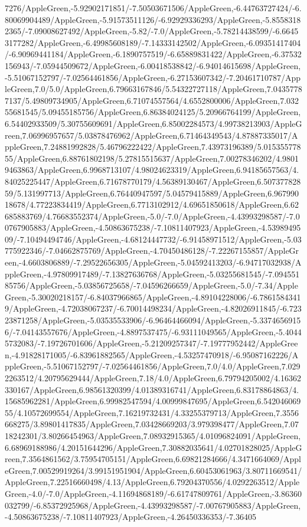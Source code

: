 {\begin{tikzternal}
7276/AppleGreen,-5.92902171851/-7.50503671506/AppleGreen,-6.44763727424/-6.80069904489/AppleGreen,-5.91573511126/-6.92929336293/AppleGreen,-5.85583182365/-7.09008627492/AppleGreen,-5.82/-7.0/AppleGreen,-5.78214438599/-6.66453177282/AppleGreen,-6.49985608189/-7.14333142502/AppleGreen,-6.09351417404/-6.90969441184/AppleGreen,-6.1890757519/-6.65889831422/AppleGreen,-6.37532156943/-7.05944509672/AppleGreen,-6.00418538842/-6.94014615698/AppleGreen,-5.51067152797/-7.02564461856/AppleGreen,-6.27153607342/-7.20461710787/AppleGreen,7.0/5.0/AppleGreen,6.79663167846/5.54322727118/AppleGreen,7.04357787137/5.49809734905/AppleGreen,6.71074557564/4.6552800006/AppleGreen,7.03255681545/5.09455185756/AppleGreen,6.86384024125/5.20966764199/AppleGreen,6.54402933509/5.30755609691/AppleGreen,6.85002284573/4.99738213903/AppleGreen,7.06996957657/5.03878476962/AppleGreen,6.71464349543/4.87887335017/AppleGreen,7.24881992828/5.46796222422/AppleGreen,7.43973196389/5.01535577855/AppleGreen,6.88761802198/5.27815515637/AppleGreen,7.00278346202/4.98019463863/AppleGreen,6.9968713107/4.98024623319/AppleGreen,6.94185657563/4.84025225447/AppleGreen,6.71678770179/4.56389130467/AppleGreen,6.50737782859/5.131997713/AppleGreen,6.76440947597/5.04579415889/AppleGreen,6.96799018678/4.77223834419/AppleGreen,6.7713102912/4.69651850618/AppleGreen,6.62685883769/4.76683552374/AppleGreen,-5.0/-7.0/AppleGreen,-4.43993298587/-7.00767905883/AppleGreen,-4.50863675238/-7.10811407923/AppleGreen,-4.5398949509/-7.10494494746/AppleGreen,-4.68124447732/-6.91458971512/AppleGreen,-5.03775922346/-7.04662875769/AppleGreen,-4.70450486128/-7.22267155857/AppleGreen,-4.6603806889/-7.29522656305/AppleGreen,-5.04592413203/-6.94717032938/AppleGreen,-4.97809917489/-7.13827636768/AppleGreen,-5.03255681545/-7.09455185756/AppleGreen,-5.03856725658/-7.04596266659/AppleGreen,-5.0/-7.34/AppleGreen,-5.30020218157/-6.84037966865/AppleGreen,-4.89104228006/-6.78615843419/AppleGreen,-4.72038067237/-6.70014498234/AppleGreen,-4.82026911845/-6.72323871258/AppleGreen,-5.03535533906/-6.96464466094/AppleGreen,-5.33746569156/-7.04143557676/AppleGreen,-4.8897537475/-6.93111049565/AppleGreen,-5.40445732083/-7.19726701606/AppleGreen,-5.21209257347/-7.19777952442/AppleGreen,-4.91828171005/-6.83961882565/AppleGreen,-4.53257470918/-6.95087162226/AppleGreen,-5.51067152797/-7.02564461856/AppleGreen,7.0/4.0/AppleGreen,7.0292263512/4.20795629444/AppleGreen,7.18/4.0/AppleGreen,6.79794205002/4.16362330167/AppleGreen,6.98561320399/4.01389316741/AppleGreen,6.83178864863/4.15685962281/AppleGreen,6.99982547594/4.00999847695/AppleGreen,6.54204606955/4.10572699554/AppleGreen,7.16219732431/4.33255379713/AppleGreen,7.3556668275/3.89801417835/AppleGreen,7.03428669203/3.979398477/AppleGreen,7.0718242301/3.80266454963/AppleGreen,7.08932915365/4.01096824091/AppleGreen,6.68969188986/4.20151644296/AppleGreen,7.30882035641/4.02701828025/AppleGreen,7.3564861562/3.75954705151/AppleGreen,6.69821284666/4.3471664069/AppleGreen,7.00529919264/3.99151951904/AppleGreen,6.60453061963/3.80711669541/AppleGreen,7.22516660498/4.13/AppleGreen,6.79204370556/4.0292263512/AppleGreen,-4.0/-7.0/AppleGreen,-4.11694868189/-6.61747809761/AppleGreen,-3.86360032799/-6.85372925968/AppleGreen,-4.43993298587/-7.00767905883/AppleGreen,-4.50863675238/-7.10811407923/AppleGreen,-4.26450336353/-7.36405
\end{tikzternal}}
